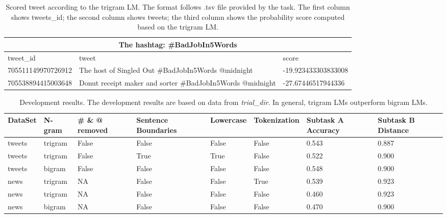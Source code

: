 \documentclass[11pt,a4paper]{article}
\begin{document}
\begin{table*}[h!]
\centering
\begin{tabular}{ |p{4.7cm}|p{4.7cm}|p{4.7cm}| } 
\hline
\multicolumn{3}{|c|}{The hashtag: \#BadJobIn5Words} \\
\hline
tweet\_id & tweet & score \\
\hline 
705511149970726912 & The host of Singled Out \#BadJobIn5Words @midnight & -19.923433303833008 \\
\hline
705538894415003648 & Donut receipt maker and sorter  \#BadJobIn5Words @midnight & -27.67446517944336 \\
\hline
\end{tabular}
\caption{Scored tweet according to the trigram LM. The format follows .tsv file provided by the task. The first column shows tweets\_id; the second column shows tweets; the third column shows the probability score computed based on the trigram LM. }
\label{table:2}
\end{table*}

\begin{table*}[h!]
\centering
\begin{tabular}{ |p{1.2cm}|p{1.2cm}|p{1.2cm}|p{1.7cm}|p{1.5cm}|p{1.9cm}|p{1.7cm}|p{1.7cm}|}
\hline
DataSet & N-gram & \# \& @ removed  & Sentence Boundaries & Lowercase & Tokenization & Subtask A Accuracy & Subtask B Distance \\
\hline
tweets & trigram & False & False & False & False & 0.543 & 0.887 \\
\hline
tweets & trigram & False & True & True & False & 0.522 & 0.900 \\
\hline
tweets & bigram & False & False & False & False & 0.548 & 0.900 \\ 
\hline
news & trigram & NA & False & False & True & 0.539 & 0.923 \\
\hline
news & trigram & NA & False & False & False & 0.460 & 0.923 \\
\hline
news & bigram & NA & False & False & False & 0.470 & 0.900 \\
\hline
\end{tabular}
\caption{Development results. The development results are based on data from \textit{trial\_dir}. In general, trigram LMs outperform bigram LMs.}
\label{table:3}
\end{table*}
\end{document}
